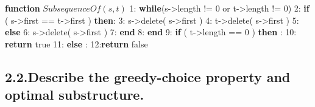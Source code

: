 \documentclass[10pt]{article}
\begin{document}
\noindent{}\textbf{function} $SubsequenceOf(s,t)$\mdbr
{}1: \textbf{while}(s-\textgreater{}length != 0 or t-\textgreater{}length != 0)\mdbr
{}2: \hspace*{1em} \textbf{if} ( s-\textgreater{}first == t-\textgreater{}first ) \textbf{then}: \mdbr
{}3: \hspace*{1em}\hspace*{1em} s-\textgreater{}delete( s-\textgreater{}first )\mdbr
{}4: \hspace*{1em}\hspace*{1em} t-\textgreater{}delete( s-\textgreater{}first )\mdbr
{}5: \hspace*{1em} \textbf{else}\mdbr
{}6: \hspace*{1em}\hspace*{1em} s-\textgreater{}delete( s-\textgreater{}first )\mdbr
{}7: \hspace*{1em} \textbf{end}\mdbr
{}8:  \textbf{end}\mdbr
{}9: \textbf{if} ( t-\textgreater{}length == 0 ) \textbf{then} :\mdbr
{}10:\hspace*{1em} \textbf{return} true\mdbr
{}11: \textbf{else} :\mdbr
{}12:\hspace*{1em}\textbf{return} false %

\mdhr{}%

\subsection{2.2.\hspace*{0.5em}Describe the greedy-choice property and optimal substructure.}\label{sec-describe-the-greedy-choice-property-and-optimal-substructure}%
\end{document}
